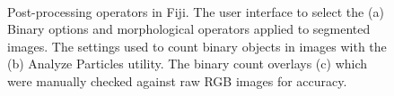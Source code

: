 \begin{figure}[!htbp]\myfloatalign
{}\
 \\
\caption[Binary options interface.]{Post-processing operators in Fiji. The user interface to select the (a) Binary options and morphological operators applied to segmented images. The settings used to count binary objects in images with the (b) Analyze Particles utility. The binary count overlays (c) which were manually checked against raw \ac{RGB} images for accuracy.}\label{fig:binary-particles-options}
\end{figure}

